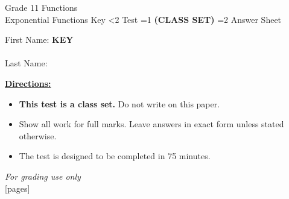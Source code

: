 \documentclass[addpoints]{exam}
\newcommand{\event}{Exponential Functions}
\newcommand{\tournament}{}
\def\type{0}
\begin{document}
\begin{center}
    {\huge Grade 11 Functions \\ \event
    \ifprintanswers \space Key
    \else \space \ifnum\type<2 Test \fi \ifnum\type=1 \textbf{(CLASS SET)} \fi
          \ifnum\type=2 Answer Sheet \fi
    \fi \\ \vspace{3mm}\tournament\vspace{1mm}}
\end{center}

\vspace{.25\textheight}

\begin{center}
    First Name: \ifprintanswers
    \underline{\hspace{3.5cm}}\textbf{KEY}\underline{\hspace{5.5cm}}\\\vspace{5mm}
    \else \underline{\hspace{10cm}}\\ \vspace{5mm} \fi
    Last Name: \underline{\hspace{10cm}}\\ \vspace{5mm}
\end{center}

\noindent\textbf{\underline{Directions:}}
\begin{itemize}
    \ifnum\type=1 \item \textbf{This test is a class set.} Do not write on this paper. \fi
    \item Show all work for full marks. Leave answers in exact form unless stated otherwise.
    \item The test is designed to be completed in 75 minutes.
\end{itemize}
\begin{center}
\textit{For grading use only}\\
[pages]
\end{center}
\end{document}
